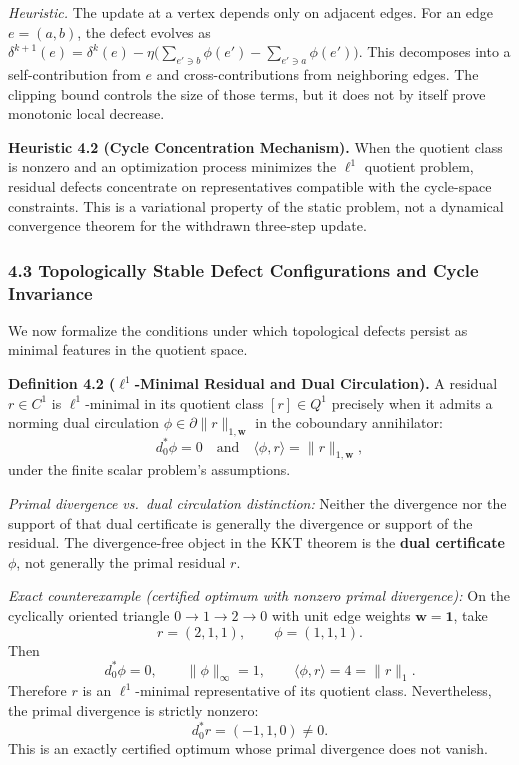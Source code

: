 \documentclass[
]{article}
\begin{document}
\emph{Heuristic.} The update at a vertex depends only on adjacent edges. For an edge \(e=(a,b)\), the defect evolves as \(\delta^{k+1}(e) = \delta^k(e) - \eta \big(\sum_{e' \ni b} \phi(e') - \sum_{e' \ni a} \phi(e')\big)\). This decomposes into a self-contribution from \(e\) and cross-contributions from neighboring edges. The clipping bound controls the size of those terms, but it does not by itself prove monotonic local decrease.

\textbf{Heuristic 4.2 (Cycle Concentration Mechanism).}
When the quotient class is nonzero and an optimization process minimizes the \(\ell^1\) quotient problem, residual defects concentrate on representatives compatible with the cycle-space constraints. This is a variational property of the static problem, not a dynamical convergence theorem for the withdrawn three-step update.

\subsubsection{4.3 Topologically Stable Defect Configurations and Cycle Invariance}\label{topologically-stable-defect-configurations-and-cycle-invariance}

We now formalize the conditions under which topological defects persist as minimal features in the quotient space.

\textbf{Definition 4.2 (\(\ell^1\)-Minimal Residual and Dual Circulation).} A residual \(r \in C^1\) is \(\ell^1\)-minimal in its quotient class \([r] \in Q^1\) precisely when it admits a norming dual circulation \(\phi \in \partial \|r\|_{1,\mathbf{w}}\) in the coboundary annihilator:
\[d_0^* \phi = 0 \quad \text{and} \quad \langle \phi, r \rangle = \|r\|_{1,\mathbf{w}},\]
under the finite scalar problem's assumptions.

\emph{Primal divergence vs.~dual circulation distinction:} Neither the divergence nor the support of that dual certificate is generally the divergence or support of the residual. The divergence-free object in the KKT theorem is the \textbf{dual certificate} \(\phi\), not generally the primal residual \(r\).

\emph{Exact counterexample (certified optimum with nonzero primal divergence):} On the cyclically oriented triangle \(0 \to 1 \to 2 \to 0\) with unit edge weights \(\mathbf{w}=\mathbf{1}\), take
\[r = (2, 1, 1), \qquad \phi = (1, 1, 1).\]
Then
\[d_0^* \phi = 0, \qquad \|\phi\|_\infty = 1, \qquad \langle \phi, r \rangle = 4 = \|r\|_1.\]
Therefore \(r\) is an \(\ell^1\)-minimal representative of its quotient class. Nevertheless, the primal divergence is strictly nonzero:
\[d_0^* r = (-1, 1, 0) \ne 0.\]
This is an exactly certified optimum whose primal divergence does not vanish.
\end{document}
